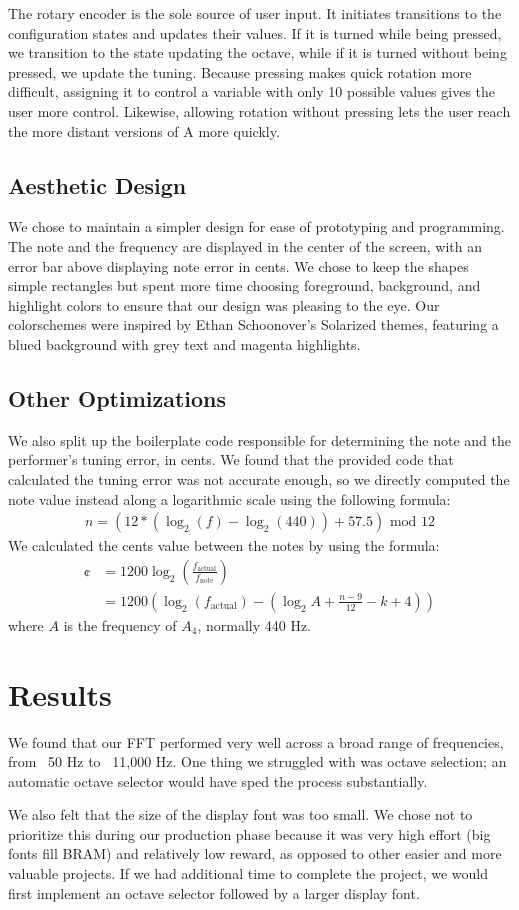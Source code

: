\documentclass{article}
\begin{document}
The rotary encoder is the sole source of user input. It initiates transitions to the configuration states and updates their values. If it is turned while being pressed, we transition to the state updating the octave, while if it is turned without being pressed, we update the tuning. Because pressing makes quick rotation more difficult, assigning it to control a variable with only 10 possible values gives the user more control. Likewise, allowing rotation without pressing lets the user reach the more distant versions of A more quickly.  
\subsection{Aesthetic Design}
We chose to maintain a simpler design for ease of prototyping and programming.
The note and the frequency are displayed in the center of the screen, with an error bar above displaying note error in cents.
We chose to keep the shapes simple rectangles but spent more time choosing foreground, background, and highlight colors to ensure that our design was pleasing to the eye.
Our colorschemes were inspired by Ethan Schoonover’s Solarized themes, featuring a blued background with grey text and magenta highlights.
\subsection{Other Optimizations}
We also split up the boilerplate code responsible for determining the note and the performer's tuning error, in cents. We found that the provided code that calculated the tuning error was not accurate enough, so we directly computed the note value instead along a logarithmic scale using the following formula:
\begin{align}
n = (12*(\log_2 (f) - \log_2(440))+57.5) \text{ mod } 12
\end{align}
We calculated the cents value between the notes by using the formula:
\begin{align}
 \cent &= 1200 \log_2\left(\frac{f_\text{actual}}{f_\text{note}}\right)\\
		&= 1200 \left(\log_2 (f_\text{actual}) - \left(\log_2 A + \frac{n - 9}{12} - k + 4\right) \right)
\end{align}
where $A$ is the frequency of $A_4$, normally 440 Hz.
\section{Results} 
	We found that our FFT performed very well across a broad range of frequencies, from ~50 Hz to ~11,000 Hz.
	One thing we struggled with was octave selection; an automatic octave selector would have sped the process substantially. \par
	We also felt that the size of the display font was too small.
	We chose not to prioritize this during our production phase because it was very high effort (big fonts fill BRAM) and relatively low reward, as opposed to other easier and more valuable projects.
	If we had additional time to complete the project, we would first implement an octave selector followed by a larger display font.
\end{document}
